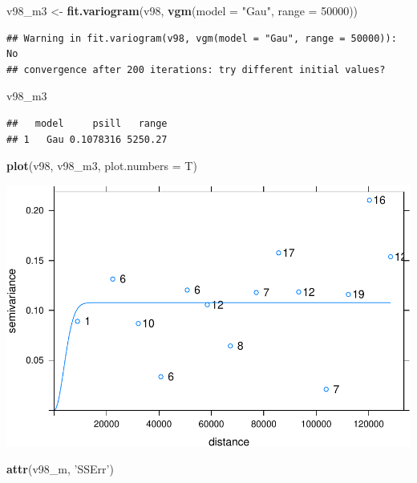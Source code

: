 \documentclass[11pt,]{article}
\newenvironment{Shaded}{\begin{snugshade}}{\end{snugshade}}
\newcommand{\KeywordTok}[1]{\textcolor[rgb]{0.13,0.29,0.53}{\textbf{#1}}}
\newcommand{\DataTypeTok}[1]{\textcolor[rgb]{0.13,0.29,0.53}{#1}}
\newcommand{\DecValTok}[1]{\textcolor[rgb]{0.00,0.00,0.81}{#1}}
\newcommand{\StringTok}[1]{\textcolor[rgb]{0.31,0.60,0.02}{#1}}
\newcommand{\NormalTok}[1]{#1}
\begin{document}
\begin{Shaded}
\begin{Highlighting}[]
\NormalTok{v98_m3 <-}\StringTok{ }\KeywordTok{fit.variogram}\NormalTok{(v98, }\KeywordTok{vgm}\NormalTok{(}\DataTypeTok{model =} \StringTok{"Gau"}\NormalTok{, }\DataTypeTok{range =} \DecValTok{50000}\NormalTok{))}
\end{Highlighting}
\end{Shaded}

\begin{verbatim}
## Warning in fit.variogram(v98, vgm(model = "Gau", range = 50000)): No
## convergence after 200 iterations: try different initial values?
\end{verbatim}

\begin{Shaded}
\begin{Highlighting}[]
\NormalTok{v98_m3}
\end{Highlighting}
\end{Shaded}

\begin{verbatim}
##   model     psill   range
## 1   Gau 0.1078316 5250.27
\end{verbatim}

\begin{Shaded}
\begin{Highlighting}[]
\KeywordTok{plot}\NormalTok{(v98, v98_m3, }\DataTypeTok{plot.numbers =}\NormalTok{ T)}
\end{Highlighting}
\end{Shaded}

\includegraphics[width=800px]{proyecto_files/figure-latex/vgm-pre1998-ajus-exp-3}

\begin{Shaded}
\begin{Highlighting}[]
\KeywordTok{attr}\NormalTok{(v98_m, }\StringTok{'SSErr'}\NormalTok{)}
\end{Highlighting}
\end{Shaded}
\end{document}
